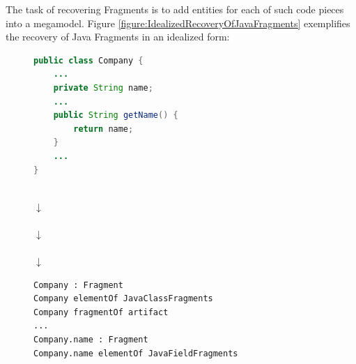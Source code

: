 The task of recovering \glspl{Fragment} is to add entities for each of such code pieces into a megamodel.
Figure \ref{figure:IdealizedRecoveryOfJavaFragments} exemplifies the recovery of \gls{Java} \glspl{Fragment} in an idealized form:
\begin{figure}[h!]
\begin{center}
\begin{minipage}{0.5\textwidth}
\begin{lstlisting}[language=Java,numbers=none]
public class Company {
	...
	private String name;
	...
	public String getName() {
		return name;
	}
	...
}
\end{lstlisting}
\end{minipage}
\\\vspace*{5mm}
{
\LARGE
\bfseries
$\downarrow$
}
\\\vspace*{5mm}
\\\vspace*{5mm}
{
\LARGE
\bfseries
$\downarrow$
}
\\\vspace*{5mm}
\\\vspace*{5mm}
{
\LARGE
\bfseries
$\downarrow$
}
\\\vspace*{5mm}
\begin{minipage}{0.5\textwidth}
\begin{lstlisting}[numbers=none]
Company : Fragment
Company elementOf JavaClassFragments
Company fragmentOf artifact
...
Company.name : Fragment
Company.name elementOf JavaFieldFragments

\end{lstlisting}
\end{minipage}
\end{center}
\end{figure}
